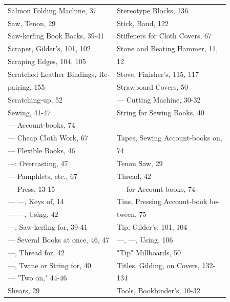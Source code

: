 \documentclass[twoside]{book}
\begin{document}
\begin{center}
\begin{tiny}
\begin{tabular}{l|l}
Salmon Folding Machine, 37         & Stereotype Blocks, 136             \\
Saw, Tenon, 29                     & Stick, Band, 122                   \\
Saw-kerfing Book Backs, 39-41      & Stiffeners for Cloth Covers, 67    \\
Scraper, Gilder's, 101, 102        & Stone and Beating Hammer, 11,      \\
Scraping Edges, 104, 105           &     12                             \\
Scratched Leather Bindings, Re-    & Stove, Finisher's, 115, 117        \\
    pairing, 155                   & Strawboard Covers, 50              \\
Scratching-up, 52                  & --- Cutting Machine, 30-32         \\
Sewing, 41-47                      & String for Sewing Books, 40        \\
--- Account-books, 74              &                                    \\
--- Cheap Cloth Work, 67           & Tapes, Sewing Account-books on,    \\
--- Flexible Books, 46             &     74                             \\
---: Overcasting, 47               & Tenon Saw, 29                      \\
--- Pamphlets, etc., 67            & Thread, 42                         \\
--- Press, 13-15                   & --- for Account-books, 74          \\
--- ---, Keys of, 14               & Tins, Pressing Account-book be-    \\
--- ---, Using, 42                 &     tween, 75                      \\
---, Saw-kerfing for, 39-41        & Tip, Gilder's, 101, 104            \\
--- Several Books at once, 46, 47  & ---, ---, Using, 106               \\
---, Thread for, 42                & "Tip" Millboards, 50               \\
---, Twine or String for, 40       & Titles, Gilding, on Covers, 132-   \\
--- "Two on," 44-46                &     134                            \\
Shears, 29                         & Tools, Bookbinder's, 10-32         \\

\end{tabular}
\end{tiny}
\end{center}
\end{document}
